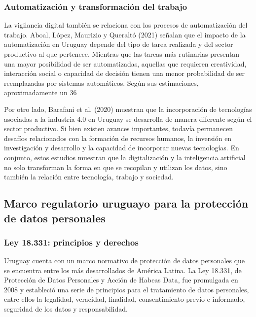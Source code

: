 \documentclass[11pt,a4paper]{article}
\begin{document}
\subsubsection{Automatización y transformación del trabajo}

La vigilancia digital también se relaciona con los procesos de automatización del trabajo. Aboal, López, Maurizio y Queraltó (2021) señalan que el impacto de la automatización en Uruguay depende del tipo de tarea realizada y del sector productivo al que pertenece. Mientras que las tareas más rutinarias presentan una mayor posibilidad de ser automatizadas, aquellas que requieren creatividad, interacción social o capacidad de decisión tienen una menor probabilidad de ser reemplazadas por sistemas automáticos. Según sus estimaciones, aproximadamente un 36%

Por otro lado, Barafani et al. (2020) muestran que la incorporación de tecnologías asociadas a la industria 4.0 en Uruguay se desarrolla de manera diferente según el sector productivo. Si bien existen avances importantes, todavía permanecen desafíos relacionados con la formación de recursos humanos, la inversión en investigación y desarrollo y la capacidad de incorporar nuevas tecnologías. En conjunto, estos estudios muestran que la digitalización y la inteligencia artificial no solo transforman la forma en que se recopilan y utilizan los datos, sino también la relación entre tecnología, trabajo y sociedad.

\subsection{Marco regulatorio uruguayo para la protección de datos personales}

\subsubsection{Ley 18.331: principios y derechos}

Uruguay cuenta con un marco normativo de protección de datos personales que se encuentra entre los más desarrollados de América Latina. La Ley 18.331, de Protección de Datos Personales y Acción de Habeas Data, fue promulgada en 2008 y estableció una serie de principios para el tratamiento de datos personales, entre ellos la legalidad, veracidad, finalidad, consentimiento previo e informado, seguridad de los datos y responsabilidad.
\end{document}

